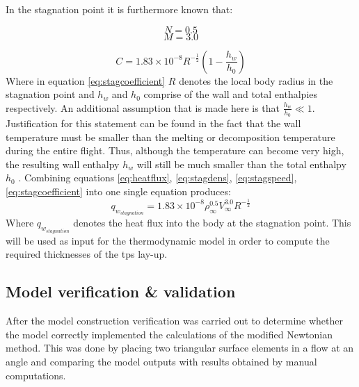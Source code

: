 In the stagnation point it is furthermore known that: 
\begin{multicols}{2}
\begin{equation}
\label{eq:stagdens}
N=0.5
\end{equation} \break
\begin{equation}
\label{eq:stagspeed}
M=3.0
\end{equation}
\end{multicols}
\begin{equation}
\label{eq:stagcoefficient}
C=1.83 \times 10^{-8} R^{-\frac{1}{2}}\left(1-\frac{h_{w}}{h_{0}}\right)
\end{equation}
Where in equation \ref{eq:stagcoefficient} $R$ denotes the local body radius in the stagnation point and $h_{w}$ and $h_{0}$ comprise of the wall and total enthalpies respectively. An additional assumption that is made here is that $\frac{h_{w}}{h_{0}}\ll 1$. Justification for this statement can be found in the fact that the wall temperature must be smaller than the melting or decomposition temperature during the entire flight. Thus, although the temperature can become very high, the resulting wall enthalpy $h_{w}$ will still be much smaller than the total enthalpy $h_{0}$ \cite[p.347]{AndersonJr.2006}. %
Combining equations \ref{eq:heatflux}, \ref{eq:stagdens}, \ref{eq:stagspeed}, \ref{eq:stagcoefficient} into one single equation produces:
\begin{equation}
q_{w_{stagnation}}=1.83 \times 10^{-8}\rho_{\infty}^{0.5} V_{\infty}^{3.0} R^{-\frac{1}{2}}
\label{eq:qstag}
\end{equation}
Where $q_{w_{stagnation}}$ denotes the heat flux into the body at the stagnation point. This will be used as input for the thermodynamic model in order to compute the required thicknesses of the \acrfull{tps} lay-up.

\subsection{Model verification \& validation}
\label{subsec:aeroverval}
After the model construction verification was carried out to determine whether the model correctly implemented the calculations of the modified Newtonian method. This was done by placing two triangular surface elements in a flow at an angle and comparing the model outputs with results obtained by manual computations. 

